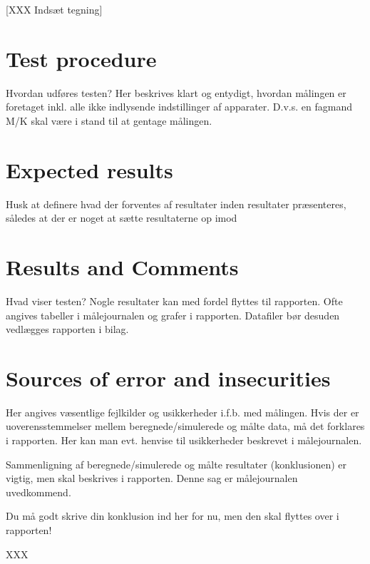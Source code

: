\documentclass[reportMaster.tex]{subfiles}
\begin{document}
[XXX Indsæt tegning]


\tocless\section{Test procedure}
Hvordan udføres testen? Her beskrives klart og entydigt, hvordan målingen er foretaget inkl. alle ikke indlysende indstillinger af apparater. D.v.s. en fagmand M/K skal være i stand til at gentage målingen.


\tocless\section{Expected results}
Husk at definere hvad der forventes af resultater inden resultater præsenteres, således at der er noget at sætte resultaterne op imod


\tocless\section{Results and Comments}
Hvad viser testen? Nogle resultater kan med fordel flyttes til rapporten. Ofte angives tabeller i målejournalen og grafer i rapporten. Datafiler bør desuden vedlægges rapporten i bilag. 




\tocless\section{Sources of error and insecurities}
Her angives væsentlige fejlkilder og usikkerheder i.f.b. med målingen. Hvis der er uoverensstemmelser mellem beregnede/simulerede og målte data, må det forklares i rapporten. Her kan man evt. henvise til usikkerheder beskrevet i målejournalen.

Sammenligning af beregnede/simulerede og målte resultater (konklusionen) er vigtig, men skal beskrives i rapporten. Denne sag er målejournalen uvedkommend.

Du må godt skrive din konklusion ind her for nu, men den skal flyttes over i rapporten! 

XXX
 


% 
%   
\end{document}
